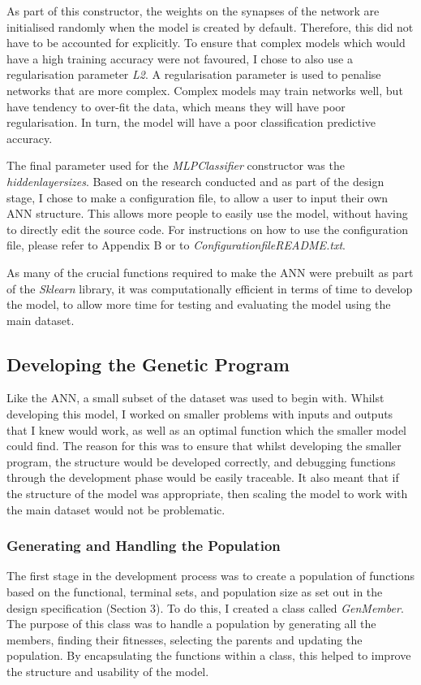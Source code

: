 \documentclass[11pt]{article}
\begin{document}
As part of this constructor, the weights on the synapses of the network are initialised randomly when the model is created by default. Therefore, this did not have to be accounted for explicitly. 
To ensure that complex models which would have a high training accuracy were not favoured, I chose to also use a regularisation parameter \textit{L2}. A regularisation parameter is used to penalise networks that are more complex. Complex models may train networks well, but have tendency to over-fit the data, which means they will have poor regularisation. In turn, the model will have a poor classification predictive accuracy. 

The final parameter used for the \textit{MLPClassifier} constructor was the \textit{hidden\textunderscore layer\textunderscore sizes}. Based on the research conducted and as part of the design stage, I chose to make a configuration file, to allow a user to input their own ANN structure. This allows more people to easily use the model, without having to directly edit the source code. For instructions on how to use the configuration file, please refer to Appendix B or to \textit{Configuration\textunderscore file\textunderscore README.txt}.

As many of the crucial functions required to make the ANN were prebuilt as part of the \textit{Sklearn} library, it was computationally efficient in terms of time to develop the model, to allow more time for testing and evaluating the model using the main dataset. 
\subsection{Developing the Genetic Program}\label{subsec:DEVGP}
Like the ANN, a small subset of the dataset was used to begin with. Whilst developing this model, I worked on smaller problems with inputs and outputs that I knew would work, as well as an optimal function which the smaller model could find. The reason for this was to ensure that whilst developing the smaller program, the structure would be developed correctly, and debugging functions through the development phase would be easily traceable. It also meant that if the structure of the model was appropriate, then scaling the model to work with the main dataset would not be problematic. 
\subsubsection{Generating and Handling the Population}\label{subsubsec:sf}
The first stage in the development process was to create a population of functions based on the functional, terminal sets, and population size as set out in the design specification (Section 3). To do this, I created a class called \textit{GenMember}. The purpose of this class was to handle a population by generating all the members, finding their fitnesses, selecting the parents and updating the population. By encapsulating the functions within a class, this helped to improve the structure and usability of the model. 
\end{document}
